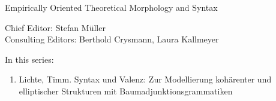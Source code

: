{\large Em­pir­i­cal­ly Ori­ent­ed The­o­ret­i­cal Mor­phol­o­gy and Syn­tax}

\bigskip

Chief Editor: Stefan Müller  \\
Consulting Editors: Berthold Crysmann, Laura Kallmeyer

\bigskip

In this series:

\begin{enumerate}
\item Lichte, Timm. Syntax und Valenz: Zur Modellierung kohärenter und elliptischer Strukturen mit Baumadjunktionsgrammatiken
\end{enumerate}



